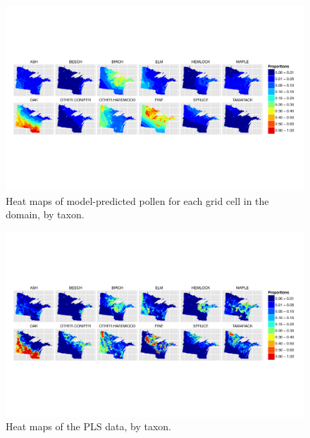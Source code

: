 \begin{figure}
\centering
\includegraphics[width=7in]{figures/maps_pollen.pdf}
\caption{Heat maps of model-predicted pollen for each grid cell in the domain, by taxon.}
\label{fig:maps_pollen}
\end{figure}

\begin{figure}
\centering
\includegraphics[width=7in]{figures/maps_veg.pdf}
\caption{Heat maps of the PLS data, by taxon.}
\label{fig:maps_pollen}
\end{figure}





